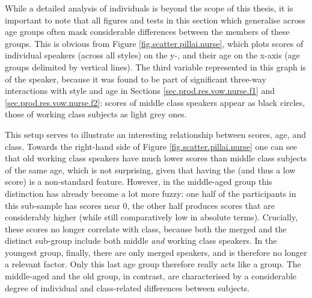 While a detailed analysis of individuals is beyond the scope of this thesis, it is important to note that all figures and tests in this section which generalise across age groups often mask considerable differences between the members of these groups.
This is obvious from Figure \ref{fig.scatter.pillai.nurse}, which plots  scores of individual speakers (across all styles) on the y-, and their age on the x-axis (age groups delimited by vertical lines).
The third variable represented in this graph is  of the speaker, because it was found to be part of significant three-way interactions with style and age in Sections \ref{sec.prod.res.vow.nurse.f1} and \ref{sec.prod.res.vow.nurse.f2}:  scores of middle class speakers appear as black circles, those of working class subjects as light grey ones.

This setup serves to illustrate an interesting relationship between  scores, age, and class.
Towards the right-hand side of Figure \ref{fig.scatter.pillai.nurse} one can see that old working class speakers have much lower  scores than middle class subjects of the same age, which is not surprising, given that having the  (and thus a low  score) is a non-standard feature.
However, in the middle-aged group this distinction has already become a lot more fuzzy: one half of the participants in this sub-sample has  scores near 0, the other half produces scores that are considerably higher (while still comparatively low in absolute terms).
Crucially, these scores no longer correlate with class, because both the merged and the distinct sub-group include both middle \emph{and} working class speakers.
In the youngest group, finally, there are only merged speakers, and  is therefore no longer a relevant factor.
Only this last age group therefore really acts like a group.
The middle-aged and the old group, in contrast, are characterised by a considerable degree of individual and class-related differences between subjects.